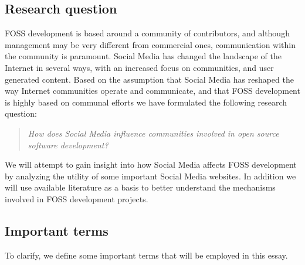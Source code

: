\documentclass[a4paper,11pt]{article} %
\begin{document}
\subsection{Research question}

FOSS development is based around a community of
contributors, and although management may be very different from commercial
ones, communication within the community is paramount. Social Media has
changed the landscape of the Internet in several ways, with an increased
focus on communities, and user generated content\cite{Kaplan201059}.
Based on the assumption that Social Media has reshaped the way Internet communities
operate and communicate, and that FOSS development is highly based on communal efforts
we have formulated the following research question:
\begin{quote}
  \textit{How does Social Media influence communities involved in open source
    software development?}
\end{quote}

We will attempt to gain insight into how Social Media affects FOSS development
by analyzing the utility of some important Social Media websites. In addition
we will use available literature as a basis to better understand the mechanisms
involved in FOSS development projects. 


\subsection{Important terms}

To clarify, we define some important terms that will be employed in this essay.
\end{document}

